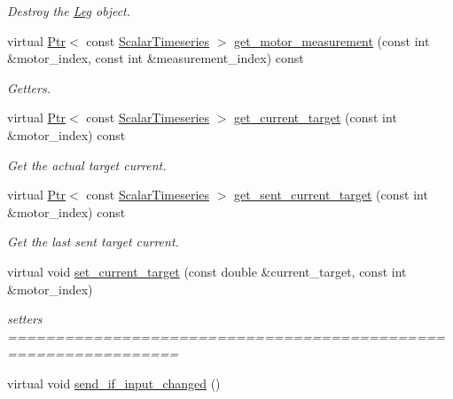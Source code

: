\begin{DoxyCompactItemize}
\begin{DoxyCompactList}\small\item\em Destroy the \hyperlink{classblmc__drivers_1_1Leg}{Leg} object. \end{DoxyCompactList}\item 
virtual \hyperlink{classblmc__drivers_1_1LegInterface_ac5af9e6514abff5ee918813925a8e42d}{Ptr}$<$ const \hyperlink{classblmc__drivers_1_1LegInterface_a57a35b64a76fb4225637828d1b1c35a6}{Scalar\+Timeseries} $>$ \hyperlink{classblmc__drivers_1_1Leg_a585436aebc39562a5d1a486810b8b9ce}{get\+\_\+motor\+\_\+measurement} (const int \&motor\+\_\+index, const int \&measurement\+\_\+index) const 
\begin{DoxyCompactList}\small\item\em Getters. \end{DoxyCompactList}\item 
virtual \hyperlink{classblmc__drivers_1_1LegInterface_ac5af9e6514abff5ee918813925a8e42d}{Ptr}$<$ const \hyperlink{classblmc__drivers_1_1LegInterface_a57a35b64a76fb4225637828d1b1c35a6}{Scalar\+Timeseries} $>$ \hyperlink{classblmc__drivers_1_1Leg_af4428c8734c5b393df8072a14850d9b1}{get\+\_\+current\+\_\+target} (const int \&motor\+\_\+index) const 
\begin{DoxyCompactList}\small\item\em Get the actual target current. \end{DoxyCompactList}\item 
virtual \hyperlink{classblmc__drivers_1_1LegInterface_ac5af9e6514abff5ee918813925a8e42d}{Ptr}$<$ const \hyperlink{classblmc__drivers_1_1LegInterface_a57a35b64a76fb4225637828d1b1c35a6}{Scalar\+Timeseries} $>$ \hyperlink{classblmc__drivers_1_1Leg_a353253074a39f566055121c2cb4adc6a}{get\+\_\+sent\+\_\+current\+\_\+target} (const int \&motor\+\_\+index) const 
\begin{DoxyCompactList}\small\item\em Get the last sent target current. \end{DoxyCompactList}\item 
virtual void \hyperlink{classblmc__drivers_1_1Leg_a05415969ef111f86837b34bdaecb7320}{set\+\_\+current\+\_\+target} (const double \&current\+\_\+target, const int \&motor\+\_\+index)\hypertarget{classblmc__drivers_1_1Leg_a05415969ef111f86837b34bdaecb7320}{}\label{classblmc__drivers_1_1Leg_a05415969ef111f86837b34bdaecb7320}

\begin{DoxyCompactList}\small\item\em setters ================================================================ \end{DoxyCompactList}\item 
virtual void \hyperlink{classblmc__drivers_1_1Leg_a82bb681e4c5047babf699cff559e9488}{send\+\_\+if\+\_\+input\+\_\+changed} ()\hypertarget{classblmc__drivers_1_1Leg_a82bb681e4c5047babf699cff559e9488}{}\label{classblmc__drivers_1_1Leg_a82bb681e4c5047babf699cff559e9488}


\end{DoxyCompactItemize}
